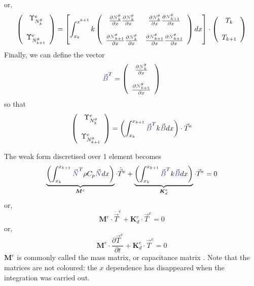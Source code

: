 or,
\[
\left(
\begin{array}{cc}
 {\Upsilon}_{N_k^\theta}^e \\ \\ {\Upsilon}_{N_{k+1}^\theta}^e
\end{array}
\right)
=
\left[
\int_{x_k}^{x^{k+1}}
k
\left(
\begin{array}{cc}
\frac{\partial {\color{Violet}N}_k^\theta}{\partial x}  \frac{\partial  {\color{Violet}N}_{k}^\theta } {\partial x}   & 
\frac{\partial {\color{Violet}N}_k^\theta}{\partial x}  \frac{\partial  {\color{Violet}N}_{k+1}^\theta } {\partial x}  
\\ \\
\frac{\partial {\color{Violet}N}_{k+1}^\theta}{\partial x}  \frac{\partial  {\color{Violet}N}_{k}^\theta } {\partial x}   & 
\frac{\partial {\color{Violet}N}_{k+1}^\theta}{\partial x}  \frac{\partial  {\color{Violet}N}_{k+1}^\theta } {\partial x}  
\end{array}
\right)
dx
\right]
\cdot
\left(
\begin{array}{c}
T_k \\ \\ T_{k+1}
\end{array}
\right)
\]
Finally, we can define the vector 
\[
{\vec {\color{Violet}B}}^T=
\left(
\begin{array}{cc}
 \frac{\partial {\color{Violet}N}_k^\theta}{\partial x}   \\ \\
 \frac{\partial {\color{Violet}N}_{k+1}^\theta}{\partial x}
\end{array}
\right)
\]
so that 
\[
\left(
\begin{array}{cc}
 {\Upsilon}_{N_k^\theta}^e \\ \\ {\Upsilon}_{N_{k+1}^\theta}^e
\end{array}
\right)
=
\left( \int_{x_k}^{x_{k+1}}   {\vec {\color{Violet}B}}^T k {\vec {\color{Violet}B}} dx  \right) \cdot {\vec T}^e
\]

The weak form discretised over 1 element becomes
\[
\underbrace{\left( \int_{x_k}^{x_{k+1}}   {\vec {\color{Violet}N}}^T \rho C_p {\vec {\color{Violet}N}} dx  \right) }_{\bm M^e} \cdot \dot{\vec T}^e
+
\underbrace{\left( \int_{x_k}^{x_{k+1}}   {\vec {\color{Violet}B}}^T k {\vec {\color{Violet}B}} dx  \right)}_{{\bm K}_d^e} \cdot {\vec T}^e
=0
\]
or,
\[
\boxed{
{\bm M}^e \cdot \dot{\vec T}^e + {\bm K}_d^e \cdot {\vec T}^e = 0
}
\]
or,
\[
\boxed{
{\bm M}^e \cdot \frac{\partial {\vec T}^e}{\partial t} + {\bm K}_d^e \cdot {\vec T}^e = 0
}
\]
${\bm M}^e$ is commonly called the {\color{olive}mass matrix}, or capacitance matrix \cite[p103]{reddybook2}.
Note that the matrices are not coloured: the $x$ dependence has disappeared when the integration was carried out.



